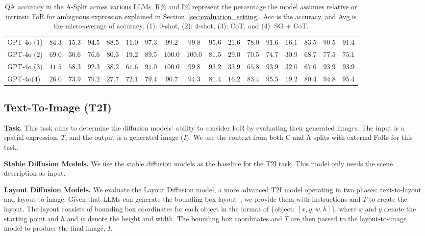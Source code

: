 \begin{table*}[t]
\begin{tabular}{|l| c c | c | c c | c| c | c | c || c c | c | c c | c| c |}
\hline
GPT-4o (1) & $\mathbf{84.3}$ & $15.3$ & $94.5$ & $\mathbf{88.5}$ & $11.0$ & $97.3$ & $99.2$ & $99.8$ & $95.6$  & $21.6$ & $\mathbf{78.0}$ & $91.6$ & $16.1$ & $\mathbf{83.5}$ & $90.5$ & $91.4$ \\
GPT-4o (2) & $\mathbf{69.0}$ & $30.6$ & $76.6$ & $\mathbf{80.3}$ & $19.2$ & $89.5$ & $100.0$ & $100.0$ & $81.5$  & $29.0$ & $\mathbf{70.5}$ & $74.7$ & $30.9$ & $\mathbf{68.7}$ & $77.5$ & $75.1$ \\
GPT-4o (3) & $41.5$ & $\mathbf{58.3}$ & $92.3$ & $38.2$ & $\mathbf{61.6}$ & $91.0$ & $100.0$ & $99.8$ & $93.2$  & $33.9$ & $\mathbf{65.8}$ & $93.9$ & $32.0$ & $\mathbf{67.6}$ & $93.9$ & $93.9$ \\
GPT-4o(4) & $26.0$ & $\mathbf{73.9}$ & $79.2$ & $27.7$ & $\mathbf{72.1}$ & $79.4$ & $96.7$ & $94.3$ & $81.4$  & $16.2$ & $\mathbf{83.4}$ & $95.5$ & $19.2$ & $\mathbf{80.4}$ & $94.8$ & $95.4$ \\
\hline
    \end{tabular}
    \caption{QA accuracy in the A-Split across various LLMs. R\% and I\% represent the percentage the model assumes relative or intrinsic FoR for ambiguous expression explained in Section~\ref{sec:evaluation_setting}. Acc is the accuracy, and Avg is the micro-average of accuracy. (1): 0-shot, (2): 4-shot, (3): CoT, and (4): SG + CoT.}
    \label{tab:A_split-QA}
\end{table*}

\subsection{Text-To-Image (T2I)}\label{sec:t2i_models}

\noindent\textbf{Task.}  This task aims to determine the diffusion models' ability to consider FoR by evaluating their generated images. The input is a spatial expression, $T$, and the output is a generated image ($I$). We use the context from both C and A splits with external FoRs for this task.

\noindent\textbf{Stable Diffusion Models.} 
We use the stable diffusion models as the baseline for the T2I task. 
This model only needs the scene description as input. 

\noindent\textbf{Layout Diffusion Models.}
We evaluate the Layout Diffusion model, a more advanced T2I model operating in two phases: text-to-layout and layout-to-image.
Given that LLMs can generate the bounding box layout~\citep{cho2023visualprogrammingtexttoimagegeneration}, we provide them with instructions and $T$ to create the layout. 
The layout consists of bounding box coordinates for each object in the format of \{object: $[x, y, w, h]$\}, where $x$ and $y$ denote the starting point and $h$ and $w$ denote the height and width. 
The bounding box coordinates and $T$ are then passed to the layout-to-image model to produce the final image, $I$. 


